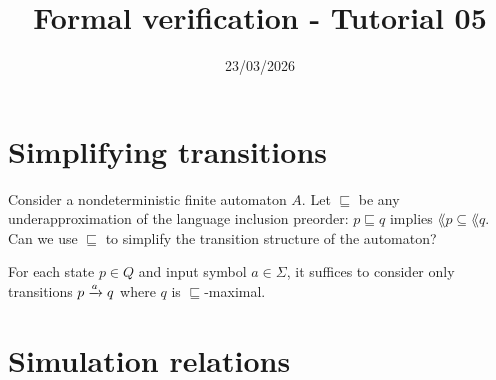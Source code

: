 

\title{Formal verification - Tutorial 05}
\date{23/03/2026}



\maketitle

\section*{Simplifying transitions}

\begin{exercise}
    Consider a nondeterministic finite automaton $A$.
    Let $\sqsubseteq$ be any underapproximation of the language inclusion preorder:
    $p \sqsubseteq q$ implies $\lang p \subseteq \lang q$.
    Can we use $\sqsubseteq$ to simplify the transition structure of the automaton?
\end{exercise}
\begin{solution}
    For each state $p \in Q$ and input symbol $a \in \Sigma$,
    it suffices to consider only transitions $p \xrightarrow{a} q$ where $q$ is $\sqsubseteq$-maximal.
\end{solution}

\section*{Simulation relations}

